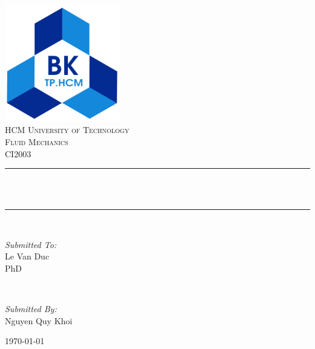 \documentclass{presets}
\begin{document}
	\begin{titlepage}
		\centering
		\includegraphics[width=5cm]{logo.png}\\[1.0 cm]	%
		\textsc{\LARGE HCM University of Technology}\\[1cm] %
		\textsc{\Large Fluid Mechanics}\\[0.5cm] %
		\textsc{\Large CI2003}\\[0.5 cm]				%
		\rule{\linewidth}{0.2 mm} \\[0.4 cm]
		{ \huge \bfseries \thetitle}\\
		\rule{\linewidth}{0.2 mm}\\[1.5cm]
		
		\begin{minipage}[t]{0.4\textwidth}
			\begin{flushleft} \large
				\emph{Submitted To:}\\
				Le Van Duc\\
				PhD\\
			\end{flushleft}
		\end{minipage}~
		\begin{minipage}[t]{0.4\textwidth}
			
			\begin{flushright} \large
				\emph{Submitted By:} \\
				Nguyen Quy Khoi\\
			\end{flushright}
			
		\end{minipage}
		\mbox{}\vfill
		{\large \today}
	\end{titlepage}
	\tableofcontents
	\listoftables
	\listoffigures
	
%	
%	
%	
%	
\end{document}
